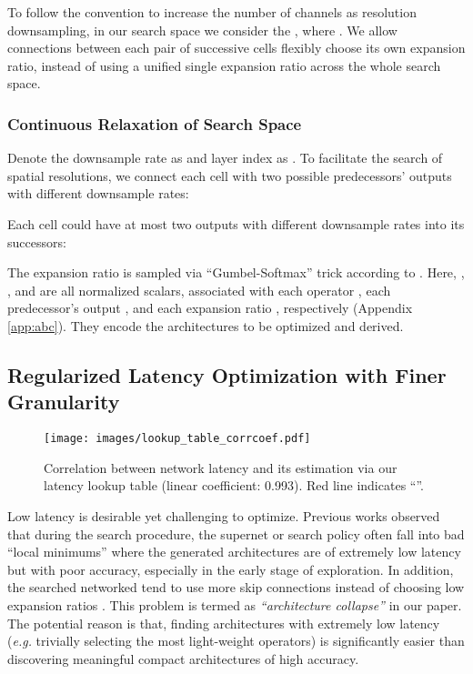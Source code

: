 \documentclass{article} \usepackage{iclr2020_conference,times}
\begin{document}
To follow the convention to increase the number of channels as resolution downsampling, in our search space we consider the
, where . We allow connections between each pair of successive cells flexibly choose its own expansion ratio, instead of using a unified single expansion ratio across the whole search space.\vspace{-0.5em}

\subsubsection{Continuous Relaxation of Search Space}\label{sec:differentiable_space}\vspace{-0.5em}
Denote the downsample rate as  and layer index as . To facilitate the search of spatial resolutions, we connect each cell with two possible predecessors' outputs with different downsample rates:\vspace{-0.3em}

Each cell could have at most two outputs with different downsample rates into its successors:\vspace{-0.4em}

The expansion ratio  is sampled via ``Gumbel-Softmax'' trick according to . Here, , , and  are all normalized scalars, associated with each operator , each predecessor's output , and each expansion ratio , respectively (Appendix \ref{app:abc}). They encode the architectures to be optimized and derived.\vspace{-1em}


\subsection{Regularized Latency Optimization with Finer Granularity}

\begin{wrapfigure}{r}{50mm}
\vspace{-3.2em}
\begin{center}
\texttt{[image: images/lookup\_table\_corrcoef.pdf]}
\end{center}
\vspace{-1.5em}
\caption{Correlation between network latency and its estimation via our latency lookup table (linear coefficient: 0.993). Red line indicates ``''.}
\vspace{-1em}
\label{fig:lookup_table}
\end{wrapfigure}

Low latency is desirable yet challenging to optimize. Previous works \citep{cheng2018instanas,zhang2019customizable} observed that during the search procedure, the supernet or search policy often fall into bad ``local minimums'' where the generated architectures are of extremely low latency but with poor accuracy, especially in the early stage of exploration. In addition, the searched networked tend to use more skip connections instead of choosing low expansion ratios \citep{shaw2019squeezenas}. This problem is termed as \textit{``architecture collapse''} in our paper. The potential reason is that, finding architectures with extremely low latency (\textit{e.g.} trivially selecting the most light-weight operators) is significantly easier than discovering meaningful compact architectures of high accuracy.
\end{document}
